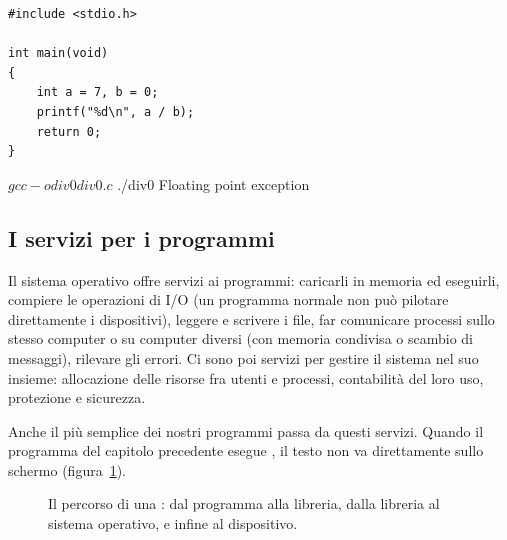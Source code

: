 \begin{affianco}[0.45][c]
\begin{lstlisting}[style=c, name=div0.c]
#include <stdio.h>

int main(void)
{
    int a = 7, b = 0;
    printf("%d\n", a / b);
    return 0;
}
\end{lstlisting}
\risultato
\begin{console}
$ gcc -o div0 div0.c
$ ./div0
Floating point exception
\end{console}
\end{affianco}

\subsection{I servizi per i programmi}

Il sistema operativo offre servizi ai programmi: caricarli in memoria ed
eseguirli, compiere le operazioni di I/O (un programma normale non può
pilotare direttamente i dispositivi), leggere e scrivere i file, far
comunicare processi sullo stesso computer o su computer diversi (con memoria
condivisa o scambio di messaggi), rilevare gli errori. Ci sono poi servizi
per gestire il sistema nel suo insieme: allocazione delle risorse fra utenti
e processi, contabilità del loro uso, protezione e sicurezza.

Anche il più semplice dei nostri programmi passa da questi servizi. Quando
il programma del capitolo precedente esegue , il testo non va
direttamente sullo schermo (figura~\ref{fig:printf-so}).

\begin{figure}[H]
  \centering
  \caption{Il percorso di una : dal programma alla libreria,
           dalla libreria al sistema operativo, e infine al dispositivo.}
  \label{fig:printf-so}
\end{figure}

